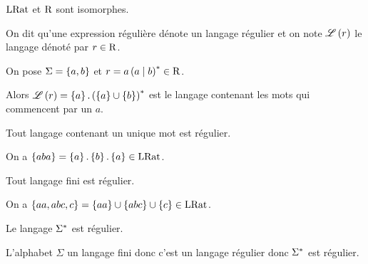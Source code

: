 \begin{rem}[HP]
\(\operatorname{LRat}\) et \(\operatorname{R}\) sont isomorphes.
\end{rem}

\begin{defi}
On dit qu'une expression régulière dénote un langage régulier et on note \(\mathscr{L}\left(r\right)\) le langage dénoté par \(r\in\operatorname{R}\).
\end{defi}

\begin{ex}
On pose \(\Sigma=\left\lbrace a,b\right\rbrace\) et \(r=a\left(a\mid b\right)^{*}\in\operatorname{R}\).

Alors \(\mathscr{L}\left(r\right)=\left\lbrace a\right\rbrace.\left(\left\lbrace a\right\rbrace\cup\left\lbrace b\right\rbrace\right)^{*}\) est le langage contenant les mots qui commencent par un \(a\).
\end{ex}

\begin{prop}
Tout langage contenant un unique mot est régulier.
\end{prop}

\begin{ex}
On a \(\left\lbrace aba\right\rbrace=\left\lbrace a\right\rbrace.\left\lbrace b\right\rbrace.\left\lbrace a\right\rbrace\in\operatorname{LRat}\).
\end{ex}

\begin{prop}
Tout langage fini est régulier.
\end{prop}

\begin{ex}
On a \(\left\lbrace aa,abc,c\right\rbrace=\left\lbrace aa\right\rbrace\cup\left\lbrace abc\right\rbrace\cup\left\lbrace c\right\rbrace\in\operatorname{LRat}\).
\end{ex}

\begin{prop}
Le langage \(\Sigma^{*}\) est régulier.
\end{prop}

\begin{dem}
L'alphabet \(\Sigma\) un langage fini donc c'est un langage régulier donc \(\Sigma^{*}\) est régulier.
\end{dem}

